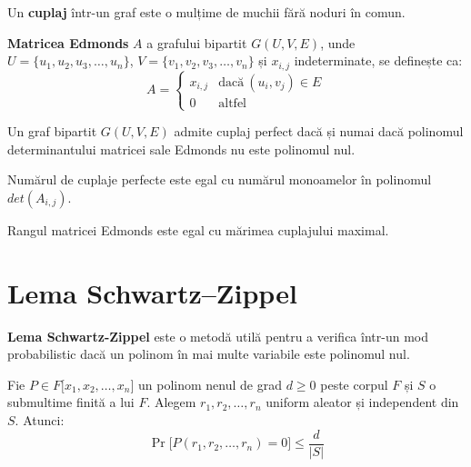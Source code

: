 \begin{defn}
  Un \textbf{cuplaj} într-un graf este o mulțime de muchii fără noduri în comun.
\end{defn}

\begin{defn}
  \textbf{Matricea Edmonds} $A$ a grafului bipartit $G(U, V, E)$, unde
  $U = \{u_{1}, u_{2}, u_{3}, \ldots, u_{n}\}$,
  $V = \{v_{1}, v_{2}, v_{3}, \ldots, v_{n}\}$ și $x_{i,j}$ indeterminate, se definește ca:
   \begin{equation}
    A=
    \begin{cases}
      x_{i,j} & \text{dacă}\ (u_{i}, v_{j}) \in E \\
      0 & \text{altfel}
    \end{cases}
  \end{equation}
\end{defn}

\begin{thm}
  \label{edmonds}
  Un graf bipartit $G(U, V, E)$ admite cuplaj perfect dacă și numai dacă
  polinomul determinantului matricei sale Edmonds nu este polinomul nul.
\end{thm}

\begin{clr}
  Numărul de cuplaje perfecte este egal cu numărul monoamelor în polinomul $det(A_{i,j})$.
\end{clr}

\begin{clr}
  Rangul matricei Edmonds este egal cu mărimea cuplajului maximal.
\end{clr}

\pagebreak

\section{Lema Schwartz–Zippel}
\textbf{Lema Schwartz-Zippel} este o metodă utilă pentru a verifica într-un mod
probabilistic dacă un polinom în mai multe variabile este polinomul nul.

\begin{thm}
  Fie $P \in F \lbrack x_{1}, x_{2}, \ldots, x_{n} \rbrack$ un polinom nenul de grad $d \geq 0$
  peste corpul $F$ și $S$ o submultime finită a lui $F$. Alegem
  $r_{1}, r_{2}, \ldots, r_{n}$ uniform aleator și independent din $S$. Atunci:
  \begin{equation}
    \Pr \lbrack P(r_{1}, r_{2}, \ldots, r_{n}) = 0 \rbrack \leq \frac{d}{|S|}
  \end{equation}
\end{thm}

